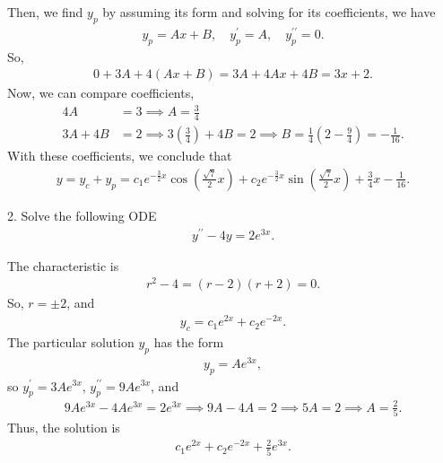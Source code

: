 \documentclass{report}
\begin{document}
    Then, we find $y_{p}$ by assuming its form and solving for its coefficients, we have
    \begin{align*}
        y_{p} = Ax + B, \quad y^{\prime}_{p} = A, \quad y^{\prime\prime}_{p} = 0
    .\end{align*}
    So,
    \begin{align*}
        0 + 3A + 4\left(Ax+B\right) = 3A+4Ax + 4B = 3x + 2
    .\end{align*}
    Now, we can compare coefficients,
    \begin{align*}
        4A &= 3 \implies A = \frac{3}{4} \\
        3A + 4B &= 2 \implies 3\left(\frac{3}{4}\right) + 4B = 2 \implies B = \frac{1}{4}\left(2-\frac{9}{4}\right) = -\frac{1}{16}
    .\end{align*}
    With these coefficients, we conclude that
    \begin{align*}
        y = y_{c} + y_{p} = c_{1}e^{-\frac{3}{2}x}\cos{\left(\frac{\sqrt{7}}{2}x\right)} + c_{2}e^{-\frac{3}{2}x}\sin{\left(\frac{\sqrt{7}}{2}x\right)} + \frac{3}{4}x - \frac{1}{16}
    .\end{align*}
    

    \bigbreak \noindent 
    \begin{mdframed}
        2. Solve the following ODE
        \begin{align*}
            y^{\prime\prime} - 4y  = 2e^{3x}
        .\end{align*}
    \end{mdframed}
    \bigbreak \noindent 
    The characteristic is 
    \begin{align*}
        r^{2}-4 = (r-2)(r+2) = 0
    .\end{align*}
    So, $r=\pm 2$, and 
    \begin{align*}
        y_{c} = c_{1}e^{2x} + c_{2}e^{-2x}
    .\end{align*}
    The particular solution $y_{p}$ has the form
    \begin{align*}
        y_{p} = Ae^{3x}
    ,\end{align*}
    so $y_{p}^{\prime} = 3Ae^{3x}$, $y^{\prime\prime}_{p} = 9Ae^{3x}$, and 
    \begin{align*}
        9Ae^{3x}-4Ae^{3x} = 2e^{3x}\implies 9A-4A = 2 \implies 5A=2 \implies A = \frac{2}{5}
    .\end{align*}
    Thus, the solution is
    \begin{align*}
        c_{1}e^{2x} + c_{2}e^{-2x} + \frac{2}{5}e^{3x}
    .\end{align*}
\end{document}
